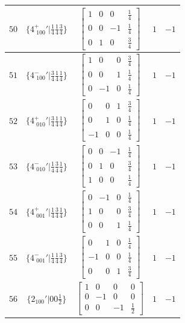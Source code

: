 \documentclass[fleqn,8pt]{jsarticle}
\begin{document}
\begin{longtable}{ccccc}
$ 50 $ & $ \{4^{+}_{\,\,100}{}'|\frac{1}{4} \frac{1}{4} \frac{3}{4}\} $ & $ \begin{bmatrix} 1 & 0 & 0 & \frac{1}{4} \\ 0 & 0 & -1 & \frac{1}{4} \\ 0 & 1 & 0 & \frac{3}{4} \end{bmatrix} $ & $ 1 $ & $ -1 $ \\ \hline
$ 51 $ & $ \{4^{-}_{\,\,100}{}'|\frac{3}{4} \frac{1}{4} \frac{1}{4}\} $ & $ \begin{bmatrix} 1 & 0 & 0 & \frac{3}{4} \\ 0 & 0 & 1 & \frac{1}{4} \\ 0 & -1 & 0 & \frac{1}{4} \end{bmatrix} $ & $ 1 $ & $ -1 $ \\ \hline
$ 52 $ & $ \{4^{+}_{\,\,010}{}'|\frac{3}{4} \frac{1}{4} \frac{1}{4}\} $ & $ \begin{bmatrix} 0 & 0 & 1 & \frac{3}{4} \\ 0 & 1 & 0 & \frac{1}{4} \\ -1 & 0 & 0 & \frac{1}{4} \end{bmatrix} $ & $ 1 $ & $ -1 $ \\ \hline
$ 53 $ & $ \{4^{-}_{\,\,010}{}'|\frac{1}{4} \frac{3}{4} \frac{1}{4}\} $ & $ \begin{bmatrix} 0 & 0 & -1 & \frac{1}{4} \\ 0 & 1 & 0 & \frac{3}{4} \\ 1 & 0 & 0 & \frac{1}{4} \end{bmatrix} $ & $ 1 $ & $ -1 $ \\ \hline
$ 54 $ & $ \{4^{+}_{\,\,001}{}'|\frac{1}{4} \frac{3}{4} \frac{1}{4}\} $ & $ \begin{bmatrix} 0 & -1 & 0 & \frac{1}{4} \\ 1 & 0 & 0 & \frac{3}{4} \\ 0 & 0 & 1 & \frac{1}{4} \end{bmatrix} $ & $ 1 $ & $ -1 $ \\ \hline
$ 55 $ & $ \{4^{-}_{\,\,001}{}'|\frac{1}{4} \frac{1}{4} \frac{3}{4}\} $ & $ \begin{bmatrix} 0 & 1 & 0 & \frac{1}{4} \\ -1 & 0 & 0 & \frac{1}{4} \\ 0 & 0 & 1 & \frac{3}{4} \end{bmatrix} $ & $ 1 $ & $ -1 $ \\ \hline
$ 56 $ & $ \{2{}_{100}{}'|0 0 \frac{1}{2}\} $ & $ \begin{bmatrix} 1 & 0 & 0 & 0 \\ 0 & -1 & 0 & 0 \\ 0 & 0 & -1 & \frac{1}{2} \end{bmatrix} $ & $ 1 $ & $ -1 $ \\ \hline

\end{longtable}
\end{document}
